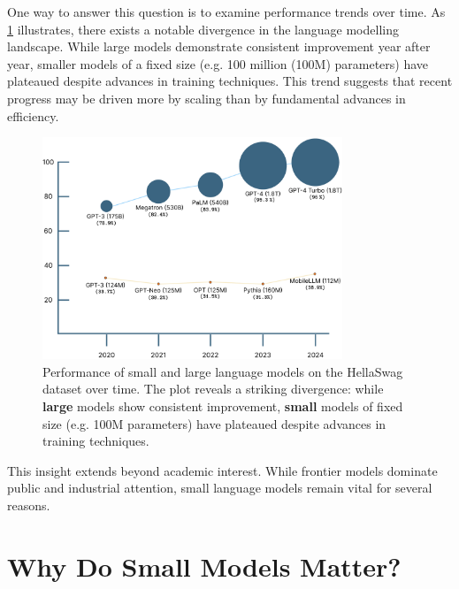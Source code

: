 One way to answer this question is to examine performance trends over time. As \cref{fig:model_size_vs_performance} illustrates, there exists a notable divergence in the language modelling landscape. While large models demonstrate consistent improvement year after year, smaller models of a fixed size (e.g. 100 million (100M) parameters) have plateaued despite advances in training techniques. This trend suggests that recent progress may be driven more by scaling than by fundamental advances in efficiency.

\begin{figure}[htbp]
    \centering
    \includegraphics[width=0.8\textwidth]{chapters/introduction/figures/lm_performance_comparison.pdf}
    \caption{Performance of small and large language models on the HellaSwag dataset over time. The plot reveals a striking divergence: while \textbf{\textcolor[HTML]{37718E}{large}} models show consistent improvement, \textbf{\textcolor[HTML]{FF7F11}{small}} models of fixed size (e.g. 100M parameters) have plateaued despite advances in training techniques.}
    \label{fig:model_size_vs_performance}
\end{figure}

This insight extends beyond academic interest. While frontier models dominate public and industrial attention, small language models remain vital for several reasons. %

\section*{Why Do Small Models Matter?}

